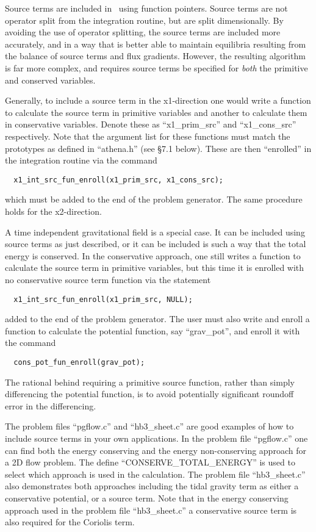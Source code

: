 Source terms are included in \ath\ using function pointers.  Source
terms are not operator split from the integration routine, but are
split dimensionally.  By avoiding the use of
operator splitting, the source terms are included more accurately,
and in a way that is better able to maintain equilibria resulting
from the balance of source terms and flux gradients.
However, the resulting algorithm is far more complex, and requires
source terms be specified for {\em both} the primitive and
conserved variables.

Generally, to include a source term in the x1-direction one would
write a function to calculate the source term in primitive variables
and another to calculate them in conservative variables.
Denote these as ``x1\_prim\_src'' and ``x1\_cons\_src'' respectively.
Note that
the argument list for these functions must match the prototypes as
defined in ``athena.h'' (see \S 7.1 below).  These are then ``enrolled'' in the
integration routine via the command
\footnotesize
\begin{verbatim}
  x1_int_src_fun_enroll(x1_prim_src, x1_cons_src);
\end{verbatim}
\normalsize
which must
be added to the end of the problem generator.  The same
procedure holds for the x2-direction.

A time independent gravitational field is a special case.  It can be
included using source terms as just described,  or it can be included
is such a way that the total energy is conserved.  In the conservative
approach, one still writes a function to calculate the source term in
primitive variables, but this time it is enrolled with no conservative
source term function via the statement
\footnotesize
\begin{verbatim}
  x1_int_src_fun_enroll(x1_prim_src, NULL);
\end{verbatim}
\normalsize
added to the end of the problem generator.   The user must also
write and enroll a function to calculate the potential function, say
``grav\_pot'', and enroll it with the command
\footnotesize
\begin{verbatim}
  cons_pot_fun_enroll(grav_pot);
\end{verbatim}
\normalsize
The rational behind requiring
a primitive source function, rather than simply differencing the
potential function, is to avoid potentially significant roundoff error
in the differencing.

The problem files ``pgflow.c'' and ``hb3\_sheet.c'' are good examples
of how to include source terms in your own applications.  In the
problem file ``pgflow.c'' one can find both the energy conserving and
the energy non-conserving approach for a 2D flow problem.  The define
\mbox{``CONSERVE\_TOTAL\_ENERGY''} is used to select which approach is used in
the calculation.  The problem file ``hb3\_sheet.c'' also demonstrates
both approaches including the tidal gravity term as either a
conservative potential, or a source term.  Note that in the energy
conserving approach used in the problem file ``hb3\_sheet.c'' a
conservative source term is also required for the Coriolis term.

